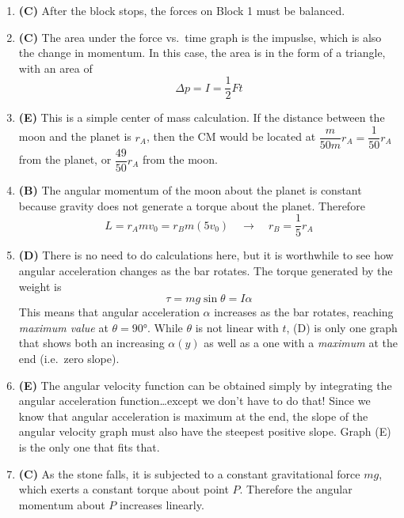 \documentclass{../../oss-handout}
\begin{document}
\begin{enumerate}[leftmargin=17pt]
\item\textbf{(C)} After the block stops, the forces on Block 1 must be balanced.
  
\item\textbf{(C)} The area under the force vs.\ time graph is the impuslse,
  which is also the change in momentum. In this case, the area is in the form
  of a triangle, with an area of
  \begin{equation*}
    \Delta p = I = \boxed{\frac12 Ft}
  \end{equation*}

\item\textbf{(E)} This is a simple center of mass calculation. If the distance
  between the moon and the planet is $r_A$, then the CM would be located at
  $\dfrac{m}{50m}r_A=\dfrac1{50}r_A$ from the planet, or
  $\boxed{\dfrac{49}{50}r_A}$ from the moon.
 
\item\textbf{(B)} The angular momentum of the moon about the planet is constant
  because gravity does not generate a torque about the planet. Therefore
  \begin{displaymath}
    L=r_Amv_0=r_Bm(5v_0)\quad\longrightarrow\quad
    r_B=\boxed{\frac15r_A}
  \end{displaymath}

\item\textbf{(D)} There is no need to do calculations here, but it is worthwhile
  to see how angular acceleration changes as the bar rotates. The torque
  generated by the weight is
  \begin{displaymath}
    \tau=mg\sin\theta=I\alpha
  \end{displaymath}
  This means that angular acceleration $\alpha$ increases as the bar rotates,
  reaching \emph{maximum value} at $\theta=\ang{90}$. While $\theta$ is not
  linear with $t$, (D) is only one graph that shows both an increasing
  $\alpha(y)$ as well as a one with a \emph{maximum} at the end (i.e.\ zero
  slope).
  
\item\textbf{(E)} The angular velocity function can be obtained simply by
  integrating the angular acceleration function\ldots except we don't have to
  do that! Since we know that angular acceleration is maximum at the end,
  the slope of the angular velocity graph must also have the steepest positive
  slope. Graph (E) is the only one that fits that.

\item\textbf{(C)} As the stone falls, it is subjected to a constant
  gravitational force $mg$, which exerts a constant torque about point $P$.
  Therefore the angular momentum about $P$ increases linearly.


\end{enumerate}
\end{document}
